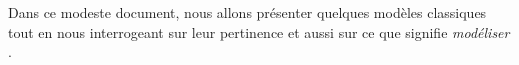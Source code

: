 Dans ce modeste document, nous allons présenter quelques modèles classiques tout en nous interrogeant sur leur pertinence et aussi sur ce que signifie \textit{\og modéliser \fg{}}.